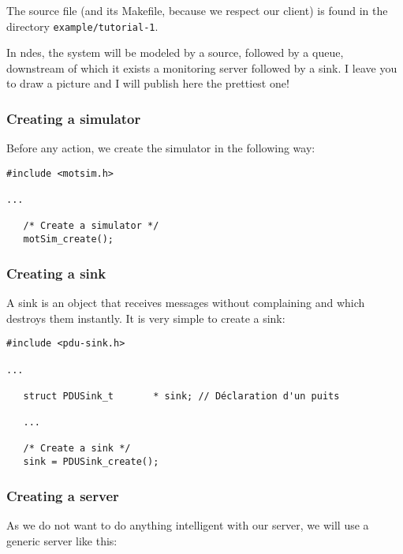    The source file (and its Makefile, because we respect our client) is found in the directory {\tt example/tutorial-1}.

   In {\sc ndes}, the system will be modeled by a source, followed by a queue, downstream of which it exists a monitoring server followed by a sink. I leave you to draw a picture and I will publish here the prettiest one!

\subsubsection{Creating a simulator}

   Before any action, we create the simulator in the following way:

\begin{verbatim}
#include <motsim.h>

...

   /* Create a simulator */
   motSim_create();
\end{verbatim}

\subsubsection{Creating a sink}

   A sink is an object that receives messages without complaining and
which destroys them instantly. It is very simple to create a sink:

\begin{verbatim}
#include <pdu-sink.h>

...

   struct PDUSink_t       * sink; // Déclaration d'un puits

   ...

   /* Create a sink */
   sink = PDUSink_create();
\end{verbatim}

%
\subsubsection{Creating a server}
   
   As we do not want to do anything intelligent with our server, we will use a generic server like this:


